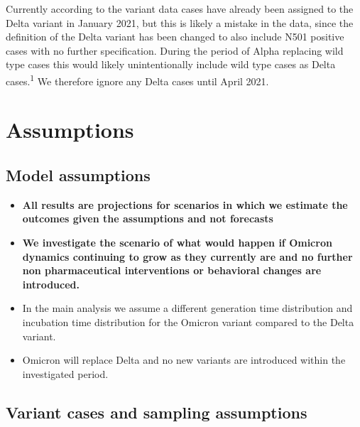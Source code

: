 \documentclass[
]{article}
\providecommand{\tightlist}{%
  \setlength{\itemsep}{0pt}\setlength{\parskip}{0pt}}
\begin{document}
Currently according to the variant data cases have already been assigned to the Delta variant in January 2021, but this is likely a
mistake in the data, since the definition of the Delta variant has been changed to also include
N501 positive cases with no further specification. During the period of Alpha replacing
wild type cases this would likely unintentionally include wild type cases as Delta cases.\textsuperscript{1}
We therefore ignore any Delta cases until April 2021.

\hypertarget{assumptions}{%
\section{Assumptions}\label{assumptions}}

\hypertarget{model-assumptions}{%
\subsection{Model assumptions}\label{model-assumptions}}

\begin{itemize}
\tightlist
\item
  \textbf{All results are projections for scenarios in which we estimate the outcomes given the assumptions and not forecasts}
\item
  \textbf{We investigate the scenario of what would happen if Omicron dynamics continuing to grow as they currently are and no further non pharmaceutical interventions or behavioral changes are introduced. }
\item
  In the main analysis we assume a different generation time distribution and incubation time distribution for the Omicron variant compared to the Delta variant.
\item
  Omicron will replace Delta and no new variants are introduced within the investigated period.
\end{itemize}

\hypertarget{variant-cases-and-sampling-assumptions}{%
\subsection{Variant cases and sampling assumptions}\label{variant-cases-and-sampling-assumptions}}
\end{document}
